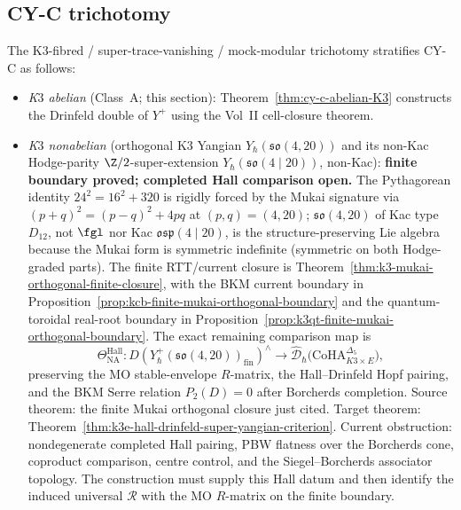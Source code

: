 \subsection{CY-C trichotomy}
\label{subsec:cy-c-per-class}

\begin{remark}
\label{rem:cy-c-per-class-trichotomy}
The K$3$-fibred / super-trace-vanishing / mock-modular trichotomy
stratifies CY-C as follows:
\begin{itemize}
\item \emph{K$3$ abelian} (Class~A; this section): Theorem~\ref{thm:cy-c-abelian-K3} constructs the Drinfeld double of \(Y^+\)
 using the Vol~II cell-closure theorem.
\item \emph{K$3$ nonabelian} (orthogonal K$3$ Yangian
 $Y_\hbar(\mathfrak{so}(4, 20))$ and its non-Kac
 Hodge-parity $\Z/2$-super-extension
 $Y_\hbar(\mathfrak{so}(4 \mid 20))$, non-Kac):
 \textbf{finite boundary proved; completed Hall comparison open.}
 The Pythagorean identity
 $24^2 = 16^2 + 320$ is rigidly forced by the Mukai signature
 via $(p + q)^2 = (p - q)^2 + 4 p q$ at $(p, q) = (4, 20)$;
 $\mathfrak{so}(4, 20)$ of Kac type $D_{12}$, not $\fgl$ nor
 Kac $\mathfrak{osp}(4 \mid 20)$, is the structure-preserving
 Lie algebra because the Mukai form is symmetric indefinite
 (symmetric on both Hodge-graded parts). The finite RTT/current
 closure is Theorem~\ref{thm:k3-mukai-orthogonal-finite-closure},
 with the BKM current boundary in
 Proposition~\ref{prop:kcb-finite-mukai-orthogonal-boundary} and the
 quantum-toroidal real-root boundary in
 Proposition~\ref{prop:k3qt-finite-mukai-orthogonal-boundary}. The
 exact remaining comparison map is
 \[
 \Theta_{\mathrm{NA}}^{\mathrm{Hall}}\colon
 D\!\left(Y_\hbar^+(\mathfrak{so}(4,20))_{\mathrm{fin}}\right)^\wedge
 \longrightarrow
 \widehat{\mathcal{D}}_\hbar
 \bigl(\mathrm{CoHA}_{K3\times E}^{\Delta_5}\bigr),
 \]
 preserving the MO stable-envelope $R$-matrix, the
 Hall--Drinfeld Hopf pairing, and the BKM Serre relation
 $P_2(D)=0$ after Borcherds completion. Source theorem: the finite
 Mukai orthogonal closure just cited. Target theorem:
 Theorem~\ref{thm:k3e-hall-drinfeld-super-yangian-criterion}. Current
 obstruction: nondegenerate completed Hall pairing, PBW flatness over
 the Borcherds cone, coproduct comparison, centre control, and the
 Siegel--Borcherds associator topology. The construction must supply
 this Hall datum and then identify the induced universal
 $\mathcal{R}$ with the MO $R$-matrix on the finite boundary.

\end{itemize}
\end{remark}
